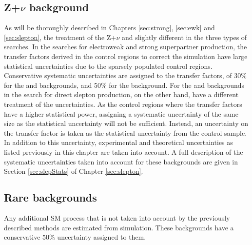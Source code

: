 \subsection*{Z+$\nu$ background}
\noindent\justify
As will be thoroughly described in Chapters \ref{sec:strong}, \ref{sec:ewk} and \ref{sec:slepton}, the treatment of the Z+$\nu$ and slightly different in the three types of searches. 
In the searches for electroweak and strong superpartner production, the transfer factors derived in the control regions to correct the simulation have large statistical uncertainties due to the sparsely populated control regions.
Conservative systematic uncertainties are assigned to the transfer factors, of 30\% for the \PWZ and \ttZ backgrounds, and 50\% for the \PZZ background.   
\newpara
\noindent\justify
For the \PWZ and \PZZ backgrounds in the search for direct slepton production, on the other hand, have a different treatment of the uncertainties. 
As the control regions where the transfer factors have a higher statistical power, assigning a systematic uncertainty of the same size as the statistical uncertainty will not be sufficient. 
Instead, an uncertainty on the transfer factor is taken as the statistical uncertainty from the control sample. 
In addition to this uncertainty, experimental and theoretical uncertainties as listed previously in this chapter are taken into account. 
A full description of the systematic uncertainties taken into account for these backgrounds are given in Section \ref{sec:slepStats} of Chapter \ref{sec:slepton}. 
\subsection*{Rare backgrounds}
\noindent\justify
Any additional SM process that is not taken into account by the previously described methods are estimated from simulation. 
These backgrounds have a conservative 50\% uncertainty assigned to them. 

